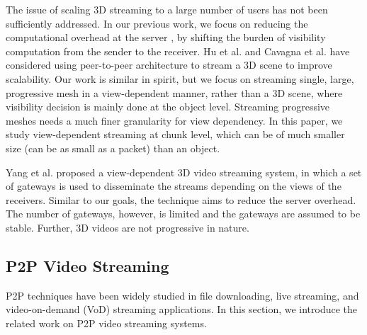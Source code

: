 The issue of scaling 3D streaming to a large number of users has not
been sufficiently addressed.  In our previous work, we focus on
reducing the computational overhead at the server \cite{Cheng2008}, by
shifting the burden of visibility computation from the sender to
the receiver.  
Hu et al. \cite{Hu2008} and Cavagna et al. \cite{Cavagna2006} have considered using peer-to-peer architecture to stream a 3D scene
to improve scalability.  Our work is similar in
spirit, but we focus on streaming single, large,
progressive mesh in a view-dependent manner, rather than a 3D scene,
    where visibility decision is mainly done at the object level.
    Streaming 
    progressive meshes needs 
    a much finer granularity for view dependency. 
    In this paper, we study view-dependent streaming at 
    chunk level, which can be of much smaller size (can be as small as a packet) than an object.

Yang et al. \cite{viewcast:yang} proposed a view-dependent 
3D video streaming system, in which a set of gateways is used 
to disseminate the streams depending on the views of the receivers.
Similar to our goals, the technique aims to reduce the server 
overhead.  The number of gateways, however, is limited and the
gateways are assumed to be stable.  Further, 3D videos are not
progressive in nature. 

\subsection{P2P Video Streaming}
\label{ss:related_p2p}
P2P techniques have been widely studied in file downloading, live
streaming, and video-on-demand (VoD) streaming applications. In this section,
we introduce the related work on P2P video streaming systems.

